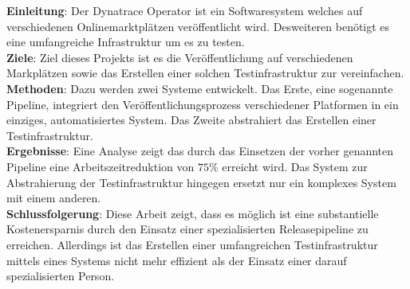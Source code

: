 \textbf{Einleitung}: Der Dynatrace Operator ist ein Softwaresystem welches auf verschiedenen Onlinemarktplätzen veröffentlicht wird.
Desweiteren benötigt es eine umfangreiche Infrastruktur um es zu testen.\\
\textbf{Ziele}: Ziel dieses Projekts ist es die Veröffentlichung auf verschiedenen Markplätzen sowie das Erstellen einer solchen Testinfrastruktur zur vereinfachen.\\
\textbf{Methoden}: Dazu werden zwei Systeme entwickelt.
Das Erste, eine sogenannte Pipeline, integriert den Veröffentlichungsprozess verschiedener Platformen in ein einziges, automatisiertes System.
Das Zweite abstrahiert das Erstellen einer Testinfrastruktur. \\
\textbf{Ergebnisse}: Eine Analyse zeigt das durch das Einsetzen der vorher genannten Pipeline eine Arbeitszeitreduktion von $75 \%$ erreicht wird.
Das System zur Abstrahierung der Testinfrastruktur hingegen ersetzt nur ein komplexes System mit einem anderen. \\
\textbf{Schlussfolgerung}: Diese Arbeit zeigt, dass es möglich ist eine substantielle Kostenersparnis durch den Einsatz einer spezialisierten Releasepipeline zu erreichen.
Allerdings ist das Erstellen einer umfangreichen Testinfrastruktur mittels eines Systems nicht mehr effizient als der Einsatz einer darauf spezialisierten Person.
